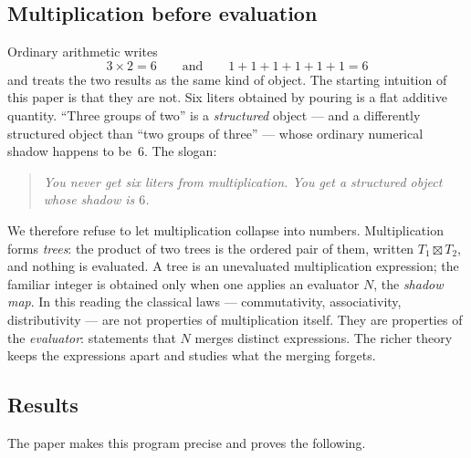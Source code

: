 \documentclass[11pt]{article}
\numberwithin{equation}{section}
\theoremstyle{plain}
\theoremstyle{definition}
\theoremstyle{remark}
\begin{document}
\subsection{Multiplication before evaluation}

Ordinary arithmetic writes
\[
3 \times 2 = 6
\qquad\text{and}\qquad
1+1+1+1+1+1 = 6
\]
and treats the two results as the same kind of object. The starting intuition of this
paper is that they are not. Six liters obtained by pouring is a flat additive quantity.
``Three groups of two'' is a \emph{structured} object --- and a differently structured
object than ``two groups of three'' --- whose ordinary numerical shadow happens to be~$6$.
The slogan:

\begin{quote}
\emph{You never get six liters from multiplication. You get a structured object whose
shadow is $6$.}
\end{quote}

We therefore refuse to let multiplication collapse into numbers. Multiplication forms
\emph{trees}: the product of two trees is the ordered pair of them, written
$T_1 \boxtimes T_2$, and nothing is evaluated. A tree is an unevaluated multiplication
expression; the familiar integer is obtained only when one applies an evaluator
$N$, the \emph{shadow map}. In this reading the classical laws --- commutativity,
associativity, distributivity --- are not properties of multiplication itself. They are
properties of the \emph{evaluator}: statements that $N$ merges distinct expressions.
The richer theory keeps the expressions apart and studies what the merging forgets.

\subsection{Results}

The paper makes this program precise and proves the following.
\end{document}
